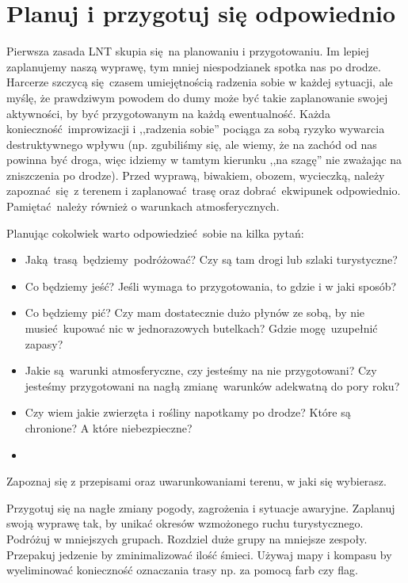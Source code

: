 
\chapter{Planuj i przygotuj się odpowiednio}

\label{rule1-plan-ahead}

Pierwsza zasada LNT skupia się na planowaniu i przygotowaniu. Im lepiej zaplanujemy naszą wyprawę, tym mniej niespodzianek spotka nas po drodze. Harcerze szczycą się czasem umiejętnością radzenia sobie w każdej sytuacji, ale myślę, że prawdziwym powodem do dumy może być takie zaplanowanie swojej aktywności, by być przygotowanym na każdą ewentualność. Każda konieczność improwizacji i ,,radzenia sobie'' pociąga za sobą ryzyko wywarcia destruktywnego wpływu (np. zgubiliśmy się, ale wiemy, że na zachód od nas powinna być droga, więc idziemy w tamtym kierunku ,,na szagę'' nie zważając na zniszczenia po drodze).
Przed wyprawą, biwakiem, obozem, wycieczką, należy zapoznać się z terenem i zaplanować trasę oraz dobrać ekwipunek odpowiednio. Pamiętać należy również o warunkach atmosferycznych. 

Planując cokolwiek warto odpowiedzieć sobie na kilka pytań:
\begin{itemize}
 \item Jaką trasą będziemy podróżować? Czy są tam drogi lub szlaki turystyczne?
 \item Co będziemy jeść? Jeśli wymaga to przygotowania, to gdzie i w jaki sposób?
 \item Co będziemy pić? Czy mam dostatecznie dużo płynów ze sobą, by nie musieć kupować nic w jednorazowych butelkach? Gdzie mogę uzupełnić zapasy?
 \item Jakie są warunki atmosferyczne, czy jesteśmy na nie przygotowani? Czy jesteśmy przygotowani na nagłą zmianę warunków adekwatną do pory roku?
 \item Czy wiem jakie zwierzęta i rośliny napotkamy po drodze? Które są chronione? A które niebezpieczne?
 \item 
\end{itemize}

\begin{zasada}
	Zapoznaj się z przepisami oraz uwarunkowaniami terenu, w jaki się wybierasz.
\end{zasada}

Przygotuj się na nagłe zmiany pogody, zagrożenia i sytuacje awaryjne.
Zaplanuj swoją wyprawę tak, by unikać okresów wzmożonego ruchu turystycznego.
Podróżuj w mniejszych grupach. Rozdziel duże grupy na mniejsze zespoły. 
Przepakuj jedzenie by zminimalizować ilość śmieci.
Używaj mapy i kompasu by wyeliminować konieczność oznaczania trasy np. za pomocą farb czy flag.
